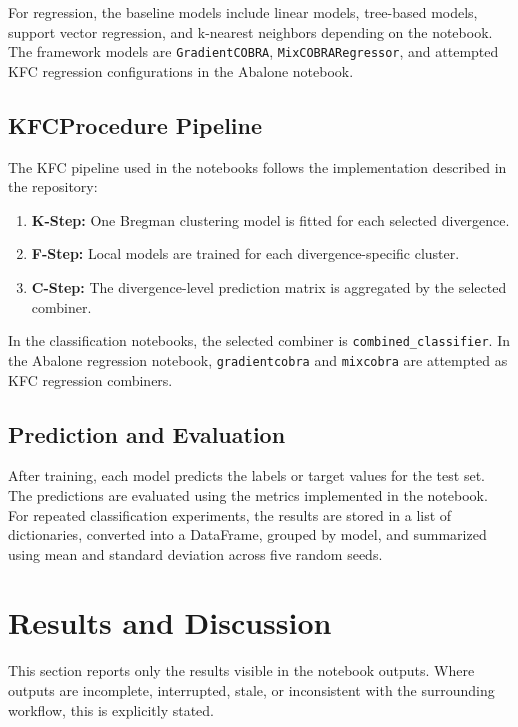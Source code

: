 For regression, the baseline models include linear models, tree-based models, support vector regression, and k-nearest neighbors depending on the notebook. The framework models are \texttt{GradientCOBRA}, \texttt{MixCOBRARegressor}, and attempted KFC regression configurations in the Abalone notebook.

\subsection{KFCProcedure Pipeline}

The KFC pipeline used in the notebooks follows the implementation described in the repository:

\begin{enumerate}
    \item \textbf{K-Step:} One Bregman clustering model is fitted for each selected divergence.
    \item \textbf{F-Step:} Local models are trained for each divergence-specific cluster.
    \item \textbf{C-Step:} The divergence-level prediction matrix is aggregated by the selected combiner.
\end{enumerate}

In the classification notebooks, the selected combiner is \texttt{combined\_classifier}. In the Abalone regression notebook, \texttt{gradientcobra} and \texttt{mixcobra} are attempted as KFC regression combiners.

\subsection{Prediction and Evaluation}

After training, each model predicts the labels or target values for the test set. The predictions are evaluated using the metrics implemented in the notebook. For repeated classification experiments, the results are stored in a list of dictionaries, converted into a DataFrame, grouped by model, and summarized using mean and standard deviation across five random seeds.

\section{Results and Discussion}
\label{sec:results_discussion}

This section reports only the results visible in the notebook outputs. Where outputs are incomplete, interrupted, stale, or inconsistent with the surrounding workflow, this is explicitly stated.

